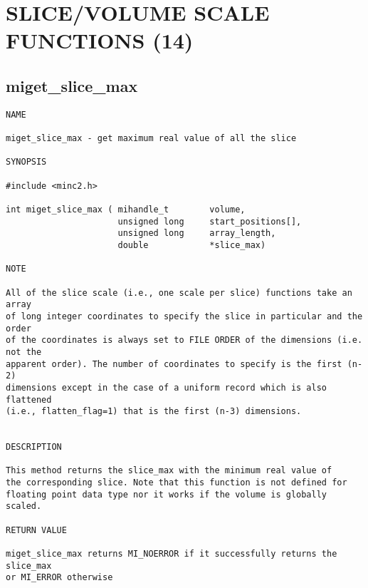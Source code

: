 \documentclass{article}
\begin{document}
\section{SLICE/VOLUME SCALE FUNCTIONS (14)}

\subsection{miget\_slice\_max}
\begin{verbatim}
NAME 

miget_slice_max - get maximum real value of all the slice

SYNOPSIS

#include <minc2.h>

int miget_slice_max ( mihandle_t        volume,
                      unsigned long     start_positions[],
                      unsigned long     array_length,
                      double            *slice_max)
                       
NOTE

All of the slice scale (i.e., one scale per slice) functions take an array
of long integer coordinates to specify the slice in particular and the order 
of the coordinates is always set to FILE ORDER of the dimensions (i.e. not the
apparent order). The number of coordinates to specify is the first (n-2) 
dimensions except in the case of a uniform record which is also flattened
(i.e., flatten_flag=1) that is the first (n-3) dimensions.                                


DESCRIPTION

This method returns the slice_max with the minimum real value of
the corresponding slice. Note that this function is not defined for
floating point data type nor it works if the volume is globally scaled.

RETURN VALUE

miget_slice_max returns MI_NOERROR if it successfully returns the slice_max
or MI_ERROR otherwise
\end{verbatim}
\end{document}
